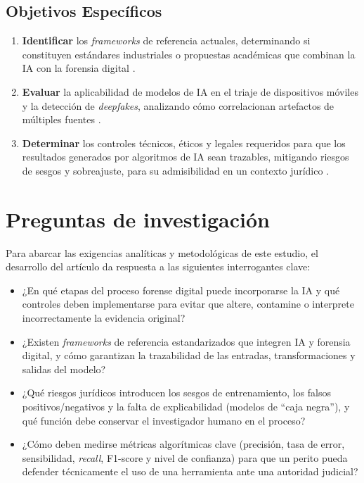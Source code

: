 \documentclass[journal]{IEEEtran}
\begin{document}
\subsection{Objetivos Específicos}
\begin{enumerate}
    \item \textbf{Identificar} los \textit{frameworks} de referencia actuales, determinando si constituyen estándares industriales o propuestas académicas que combinan la IA con la forensia digital \cite{KhalidZainab2024TauX}.
    \item \textbf{Evaluar} la aplicabilidad de modelos de IA en el triaje de dispositivos móviles y la detección de \textit{deepfakes}, analizando cómo correlacionan artefactos de múltiples fuentes \cite{10.1145/3733102.3733138, VASILARAS2024301737}.
    \item \textbf{Determinar} los controles técnicos, éticos y legales requeridos para que los resultados generados por algoritmos de IA sean trazables, mitigando riesgos de sesgos y sobreajuste, para su admisibilidad en un contexto jurídico \cite{alma991005936804107681, FAHNDRICH2023301617}.
\end{enumerate}

\section{Preguntas de investigación}
Para abarcar las exigencias analíticas y metodológicas de este estudio, el desarrollo del artículo da respuesta a las siguientes interrogantes clave:
\begin{itemize}
    \item ¿En qué etapas del proceso forense digital puede incorporarse la IA y qué controles deben implementarse para evitar que altere, contamine o interprete incorrectamente la evidencia original?
    \item ¿Existen \textit{frameworks} de referencia estandarizados que integren IA y forensia digital, y cómo garantizan la trazabilidad de las entradas, transformaciones y salidas del modelo?
    \item ¿Qué riesgos jurídicos introducen los sesgos de entrenamiento, los falsos positivos/negativos y la falta de explicabilidad (modelos de ``caja negra''), y qué función debe conservar el investigador humano en el proceso?
    \item ¿Cómo deben medirse métricas algorítmicas clave (precisión, tasa de error, sensibilidad, \textit{recall}, F1-score y nivel de confianza) para que un perito pueda defender técnicamente el uso de una herramienta ante una autoridad judicial? \cite{WarrenEricM.2025Ceal}
\end{itemize}
\end{document}

